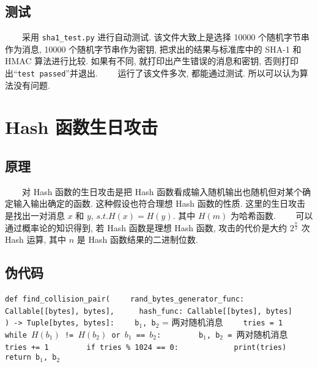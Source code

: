 \documentclass[12pt,a4paper]{article}
\begin{document}
\subsection*{测试}

　　采用 \verb|sha1_test.py| 进行自动测试. 该文件大致上是选择 10000 个随机字节串作为消息, 10000 个随机字节串作为密钥, 把求出的结果与标准库中的 SHA-1 和 HMAC 算法进行比较. 如果有不同, 就打印出产生错误的消息和密钥, 否则打印出“\verb|test passed|”并退出. 
\newline
　　运行了该文件多次, 都能通过测试. 所以可以认为算法没有问题. 

\section*{Hash 函数生日攻击}

\subsection*{原理}

　　对 Hash 函数的生日攻击是把 Hash 函数看成输入随机输出也随机但对某个确定输入输出确定的函数. 这种假设也符合理想 Hash 函数的性质. 这里的生日攻击是找出一对消息 $ x $ 和 $ y $, $ s.t. H(x) = H(y) $. 其中 $ H(m) $ 为哈希函数. 
\newline
　　可以通过概率论的知识得到, 若 Hash 函数是理想 Hash 函数, 攻击的代价是大约 $ 2^{\frac{n}{2}} $ 次 Hash 运算, 其中 $ n $ 是 Hash 函数结果的二进制位数. 

\subsection*{伪代码}

\lstinline{def find_collision_pair(}
\newline
\lstinline{    rand_bytes_generator_func: Callable[[bytes], bytes], }
\newline
\lstinline{    hash_func: Callable[[bytes], bytes]}
\newline
\lstinline{    ) -> Tuple[bytes, bytes]:}
\newline
\lstinline{    b}$_1$\lstinline{, b}$_2$ = 两对随机消息
\newline
\lstinline{    tries = 1}
\newline
\lstinline{    while }$ H(b_1) $\lstinline{ != }$ H(b_2) $\lstinline{ or }$ b_1 $\lstinline{ == }$ b_2 $\lstinline{:}
\newline
\lstinline{        b}$_1$\lstinline{, b}$_2$\lstinline{ = }两对随机消息
\newline
\lstinline{        tries += 1}
\newline
\lstinline{        if tries % 1024 == 0:}
\newline
\lstinline{            print(tries)}
\newline
\lstinline{    return b}$_1$\lstinline{, b}$_2$
\end{document}
